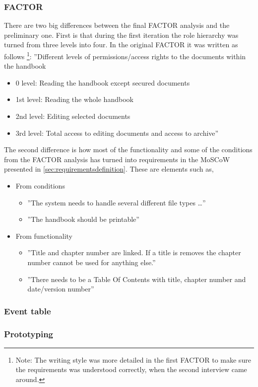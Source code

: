 \subsubsection*{FACTOR}
There are two big differences between the final FACTOR analysis and the preliminary one.
First is that during the first iteration the role hierarchy was turned from three levels into four. 
In the original FACTOR it was written as follows
\footnote{Note: The writing style was more detailed in the first FACTOR to make sure the requirements was understood correctly, when the second interview came around.}:
\newline
''Different levels of permissions/access rights to the documents within the handbook
\begin{itemize}
	\item 
	0 level:
	Reading the handbook except secured documents
	\item 
	1st level:
	Reading the whole handbook
	\item 
	2nd level:
	Editing selected documents
	\item 
	3rd level:
	Total access to editing documents and access to archive''
\end{itemize}

The second difference is how most of the functionality and some of the conditions from the FACTOR analysis has turned into requirements in the MoSCoW presented in \cref{sec:requirementsdefinition}. These are elements such as,
\begin{itemize}
	\item From conditions
	\begin{itemize}
		\item 
		''The system needs to handle several different file types \ldots''
		\item 
		''The handbook should be printable''
	\end{itemize}
	\item From functionality
	\begin{itemize}
		\item 
		''Title and chapter number are linked. If a title is removes the chapter number cannot be used for anything else.''
		\item 
		''There needs to be a Table Of Contents with title, chapter number and date/version number''
	\end{itemize}
\end{itemize}

\subsubsection*{Event table}

\subsubsection*{Prototyping}



